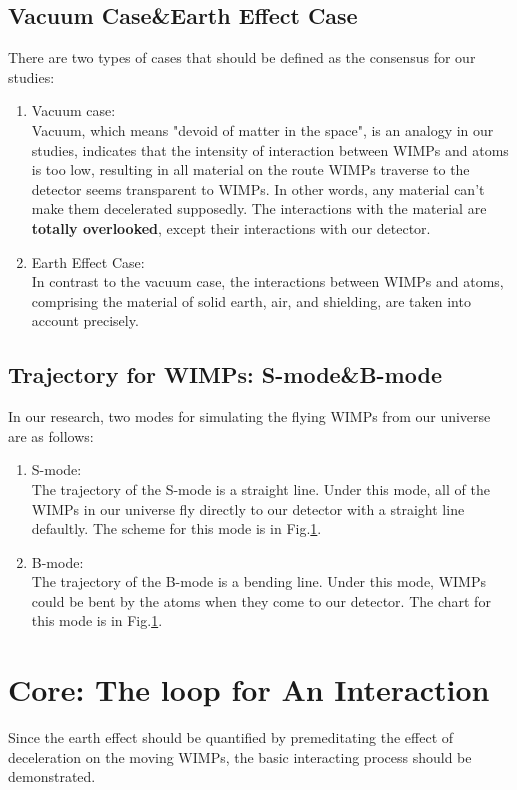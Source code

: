 \subsection{Vacuum Case\&Earth Effect Case}
There are two types of cases that should be defined as the consensus for our studies:
\begin{enumerate}
	\item Vacuum case:\\
	 Vacuum, which means "devoid of matter in the space", is an analogy in our studies, indicates that the intensity of interaction between WIMPs and atoms is too low, resulting in all material on the route WIMPs traverse to the detector seems transparent to WIMPs. In other words, any material can't make them decelerated supposedly. The interactions with the material are { \bf totally overlooked}, except their interactions with our detector.
	\item Earth Effect Case:\\
	In contrast to the vacuum case, the interactions between WIMPs and atoms, comprising the material of solid earth, air, and shielding, are taken into account precisely. 
\end{enumerate}

\subsection{Trajectory for WIMPs: S-mode\&B-mode}
In our research, two modes for simulating the flying WIMPs from our universe are as follows:
\begin{enumerate}
	\item S-mode:\\
	The trajectory of the S-mode is a straight line. Under this mode, all of the WIMPs in our universe fly directly to our detector with a straight line defaultly. The scheme for this mode is in Fig.\ref{}.
	\item B-mode:\\
	The trajectory of the B-mode is a bending line. Under this mode, WIMPs could be bent by the atoms when they come to our detector. The chart for this mode is in Fig.\ref{}.
\end{enumerate}


\section{Core: The loop for An Interaction}
Since the earth effect should be quantified by premeditating the effect of deceleration on the moving WIMPs, the basic interacting process should be demonstrated.\\

